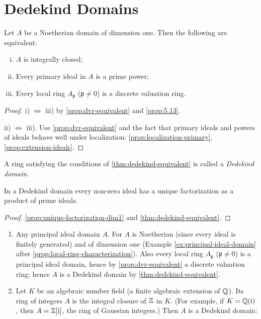 \section*{Dedekind Domains}
\begin{theorem}\label{thm:dedekind-equivalent}
Let $A$ be a Noetherian domain of dimension one. Then the following are equivalent:
\begin{enumerate}[i)]
    \item $A$ is integrally closed;
    \item Every primary ideal in $A$ is a prime power;
    \item Every local ring $A_{\mathfrak{p}}$ ($\mathfrak{p} \neq 0$) is a discrete valuation ring.
\end{enumerate}
\end{theorem}

\begin{proof}
i) $\iff$ iii) by \eqref{prop:dvr-equivalent} and \eqref{prop:5.13}.

ii) $\iff$ iii). Use \eqref{prop:dvr-equivalent} and the fact that primary ideals and powers of ideals behave well under localization: \eqref{prop:localization-primary}, \eqref{prop:extension-ideals}.
\end{proof}

A ring satisfying the conditions of \eqref{thm:dedekind-equivalent} is called a \emph{Dedekind domain}.

\begin{corollary}\label{cor:dedekind-unique-factorization}
In a Dedekind domain every non-zero ideal has a unique factorization as a product of prime ideals.
\end{corollary}

\begin{proof}
\eqref{prop:unique-factorization-dim1} and \eqref{thm:dedekind-equivalent}.
\end{proof}

\begin{examples}
\begin{enumerate}[1)]
    \item Any principal ideal domain $A$. For $A$ is Noetherian (since every ideal is finitely generated) and of dimension one (Example \ref{ex:principal-ideal-domain} after \eqref{prop:local-ring-characterization}). Also every local ring $A_{\mathfrak{p}}$ ($\mathfrak{p} \neq 0$) is a principal ideal domain, hence by \eqref{prop:dvr-equivalent} a discrete valuation ring; hence $A$ is a Dedekind domain by \eqref{thm:dedekind-equivalent}.
    
    \item Let $K$ be an algebraic number field (a finite algebraic extension of $\mathbb{Q}$). Its ring of integers $A$ is the integral closure of $\mathbb{Z}$ in $K$. (For example, if $K = \mathbb{Q}(\mathrm{i})$, then $A = \mathbb{Z}[\mathrm{i}]$, the ring of Gaussian integers.) Then $A$ is a Dedekind domain:
\end{enumerate}
\end{examples}


